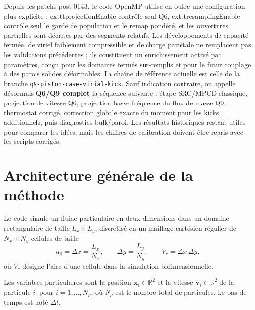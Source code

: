 \documentclass[11pt,a4paper]{article}
\begin{document}
Depuis les patchs post-0143, le code OpenMP utilise en outre une configuration plus explicite : 	exttt{projectionEnable} contrôle seul Q6, 	exttt{resamplingEnable} contrôle seul le garde de population et le remap pondéré, et les ouvertures partielles sont décrites par des segments relatifs. Les développements de capacité fermée, de viriel faiblement compressible et de charge pariétale ne remplacent pas les validations précédentes ; ils constituent un enrichissement activé par paramètres, conçu pour les domaines fermés sur-remplis et pour le futur couplage à des parois solides déformables.
La chaîne de référence actuelle est celle de la branche \texttt{q9-piston-case-virial-kick}. Sauf indication contraire, on appelle désormais \textbf{Q6/Q9 complet} la séquence suivante : étape SRC/MPCD classique, projection de vitesse Q6, projection basse fréquence du flux de masse Q9, thermostat corrigé, correction globale exacte du moment pour les kicks additionnels, puis diagnostics bulk/paroi. Les résultats historiques restent utiles pour comparer les idées, mais les chiffres de calibration doivent être repris avec les scripts corrigés.

\section{Architecture générale de la méthode}

Le code simule un fluide particulaire en deux dimensions dans un domaine rectangulaire de taille $L_x \times L_y$, discrétisé en un maillage cartésien régulier de $N_x \times N_y$ cellules de taille
\begin{equation}
 a_0 = \Delta x = \frac{L_x}{N_x},
 \qquad
 \Delta y = \frac{L_y}{N_y},
 \qquad
 V_c = \Delta x\,\Delta y,
\end{equation}
où $V_c$ désigne l'aire d'une cellule dans la simulation bidimensionnelle.

Les variables particulaires sont la position $\bm{x}_i \in \mathbb{R}^2$ et la vitesse $\bm{v}_i \in \mathbb{R}^2$ de la particule $i$, pour $i=1,\dots,N_p$, où $N_p$ est le nombre total de particules. Le pas de temps est noté $\Delta t$.
\end{document}
